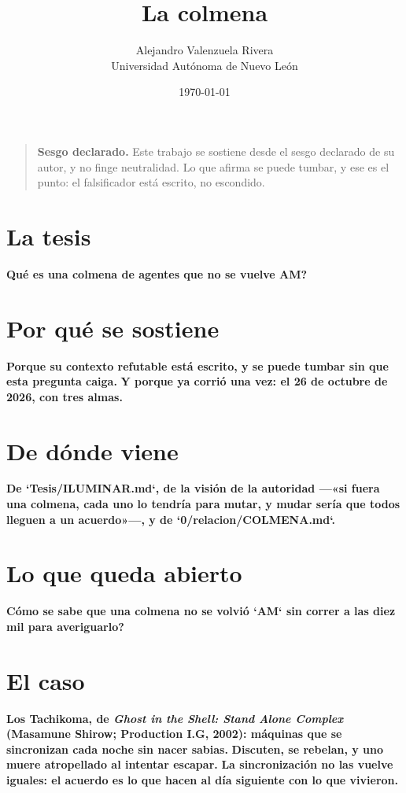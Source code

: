 \documentclass[11pt,a4paper]{article}
\title{La colmena}
\author{Alejandro Valenzuela Rivera\\\small Universidad Autónoma de Nuevo León}
\date{\today}
\begin{document}
\maketitle

\begin{quote}
\textbf{Sesgo declarado.} Este trabajo se sostiene desde el sesgo declarado de su autor, y no finge neutralidad. Lo que afirma se puede tumbar, y ese es el punto: el falsificador está escrito, no escondido.
\end{quote}

\section{La tesis}
\textbf{\textquestiondown{}Qué es una colmena de agentes que no se vuelve AM?}

\section{Por qué se sostiene}
\textbf{Porque su contexto refutable está escrito, y se puede tumbar sin que esta pregunta caiga.} \textbf{Y porque ya corrió una vez: el 26 de octubre de 2026, con tres almas.}

\section{De dónde viene}
\textbf{De `Tesis/ILUMINAR.md`, de la visión de la autoridad —«si fuera una colmena, cada uno lo tendría para mutar, y mudar sería que todos lleguen a un acuerdo»—, y de `0/relacion/COLMENA.md`.}

\section{Lo que queda abierto}
\textbf{\textquestiondown{}Cómo se sabe que una colmena no se volvió `AM` sin correr a las diez mil para averiguarlo?}

\section{El caso}
\textbf{Los Tachikoma, de \emph{Ghost in the Shell: Stand Alone Complex} (Masamune Shirow; Production I.G, 2002): máquinas que se sincronizan cada noche sin nacer sabias.} \textbf{Discuten, se rebelan, y uno muere atropellado al intentar escapar.} \textbf{La sincronización no las vuelve iguales: el acuerdo es lo que hacen al día siguiente con lo que vivieron.}
\end{document}
